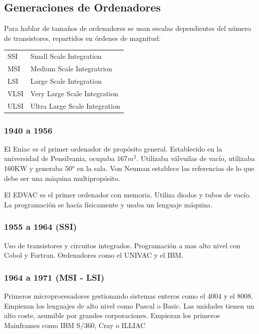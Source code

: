 \subsection{Generaciones de Ordenadores}
    Para hablar de tamaños de ordenadores se usan escalas dependientes del número de transistores, repartidos en órdenes de magnitud:
    \begin{table}[H]
    \begin{tabular}{ll}
        SSI & Small Scale Integration \\
        MSI & Medium Scale Integratrion \\
        LSI & Large Scale Integration\\
        VLSI & Very Large Scale Integration\\
        ULSI & Ultra Large Scale Integration\\
    \end{tabular}
    \end{table}

    \subsubsection{1940 a 1956}
        El Eniac es el primer ordenador de propósito general. Establecido en la universidad de Pensilvania, ocupaba \begin{math}167m^2\end{math}. Utilizaba válvuilas de vacío, utilizaba 160KW y generaba 50° en la sala. Von Neuman establece las referencias de lo que debe ser una máquina multipropósito.

        El EDVAC es el primer ordenador con memoria. Utiliza diodos y tubos de vacío. La programación se hacía físicamente y usaba un lenguaje máquina.

    \subsubsection{1955 a 1964 (SSI)}
        Uso de transistores y circuitos integrados. Programación a mas alto nivel con Cobol y Fortran. Ordenadores como el UNIVAC y el IBM.

    \subsubsection{1964 a 1971 (MSI - LSI)}
        Primeros microprocesadores gestionando sistemas enteros como el 4004 y el 8008. Empiezan los lenguajes de alto nivel como Pascal o Basic. Las unidades tienen un alto coste, asumible por grandes corporaciones. Empiezan los primeros Mainframes como IBM S/360, Cray o ILLIAC

